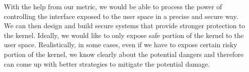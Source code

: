 With the help from our metric, we would be able to process the power of controlling the interface 
exposed to the user space in a precise and secure way. We can then design and build secure systems 
that provide stronger protection to the kernel. Ideally, we would like to only expose safe portion 
of the kernel to the user space. Realistically, in some cases, even if we have to expose certain risky portion 
of the kernel, we know clearly about the potential dangers and therefore can come up with better 
strategies to mitigate the potential damage. 
